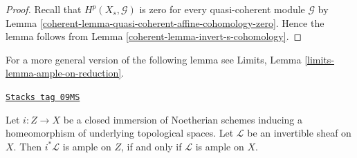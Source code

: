 \begin{proof}

Recall that $H^p(X_s, \mathcal{G})$ is zero for every quasi-coherent
module $\mathcal{G}$ by
Lemma \ref{coherent-lemma-quasi-coherent-affine-cohomology-zero}.
Hence the lemma follows from
Lemma \ref{coherent-lemma-invert-s-cohomology}.
\end{proof}

For a more general version of the following lemma see
Limits, Lemma \ref{limits-lemma-ample-on-reduction}.

\begin{lemma}
\label{coherent-lemma-ample-on-reduction}
\href{https://stacks.math.columbia.edu/tag/09MS}{\texttt{Stacks tag 09MS}}

Let $i : Z \to X$ be a closed immersion of Noetherian schemes
inducing a homeomorphism of underlying topological spaces.
Let $\mathcal{L}$ be an invertible sheaf on $X$.
Then $i^*\mathcal{L}$ is ample on $Z$, if and only if
$\mathcal{L}$ is ample on $X$.
\end{lemma}

